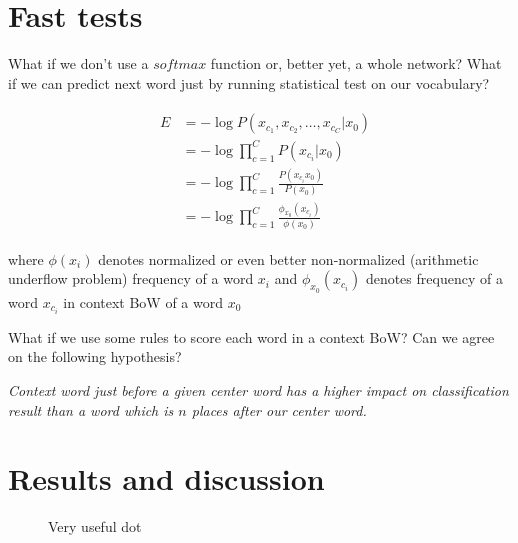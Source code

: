 \documentclass{article}
\newcommand{\fig}[2]{
	\begin{figure}[!htb]
		\center{\texttt{[image: res/\#1]}}
		\caption{\label{fig:caption} #2}
	\end{figure}
}
\begin{document}
\section{Fast tests}

What if we don't use a $softmax$ function or, better yet, a whole network? What if
we can predict next word just by running statistical test on our vocabulary?

\begin{align}	
	&\begin{aligned}	
		E &= -\log P(x_{c_1}, x_{c_2},\ldots,x_{c_C}|x_0) \\
		&= -\log \prod_{c=1}^C P(x_{c_i}|x_0) \\
		&= -\log \prod_{c=1}^C \frac{P(x_{c_i}x_0)}{P(x_0)} \\
		&= -\log \prod_{c=1}^C \frac{\phi_{x_0}(x_{c_i})}{\phi(x_0)}
	\end{aligned}
\end{align}

where $\phi(x_i)$ denotes normalized or even better
non-normalized (arithmetic underflow problem) frequency of
a word $x_i$ and $\phi_{x_0}(x_{c_i})$ denotes frequency of
a word $x_{c_i}$ in context BoW of a word $x_0$

What if we use some rules to score each word in a context BoW? Can we agree
on the following hypothesis?

\medbreak

\textit{Context word just before a given center word has a
higher impact on classification result than a word which is $n$ places after our
center word.}

\section{Results and discussion}

\fig{chart}{Very useful dot}
\end{document}
